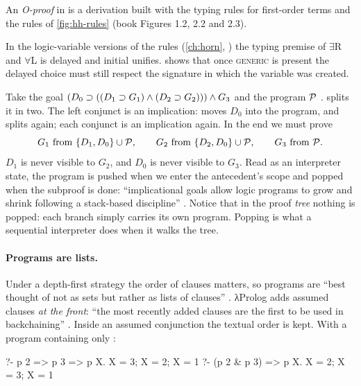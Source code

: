 {\begin{definition}\label{def:hh-oproof}
An \emph{O-proof} in \fohh{} is a derivation built with the typing rules for first-order terms and the
rules of \cref{fig:hh-rules} (book Figures 1.2, 2.2 and 2.3).
\end{definition}

In the logic-variable versions of the rules (\cref{ch:horn}, ) the typing premise of
$\exists$R and $\forall$L is delayed and initial unifies.  shows that once
\textsc{generic} is present the delayed choice must still respect the signature in which the variable was
created.

\begin{tutorial}
Take the goal $(D_0\supset((D_1\supset G_1)\wedge(D_2\supset G_2)))\wedge G_3$ and the program $\mathcal{P}$ .
 splits it in two. The left conjunct is an implication:  moves $D_0$ into
the program, and  splits again; each conjunct is an implication again. In the end we must
prove
\[
G_1 \text{ from } \{D_1,D_0\}\cup\mathcal{P},\qquad
G_2 \text{ from } \{D_2,D_0\}\cup\mathcal{P},\qquad
G_3 \text{ from } \mathcal{P}.
\]
$D_1$ is never visible to $G_2$, and $D_0$ is never visible to $G_3$. Read as an interpreter state,
the program is pushed when we enter the antecedent's scope and popped when the subproof is done:
``implicational goals allow logic programs to grow and shrink following a stack-based discipline''
. Notice that in the proof \emph{tree} nothing is popped: each branch simply carries its own
program. Popping is what a sequential interpreter does when it walks the tree.
\end{tutorial}

\paragraph{Programs are lists.} Under a depth-first strategy the order of clauses matters, so programs
are ``best thought of not as sets but rather as lists of clauses'' . λProlog adds assumed
clauses \emph{at the front}: ``the most recently added clauses are the first to be used in backchaining''
. Inside an assumed conjunction  the textual order is kept. With a program
containing only :
\begin{lprolog}
?- p 2 => p 3 => p X.
X = 3;
X = 2;
X = 1
?- (p 2 & p 3) => p X.
X = 2;
X = 3;
X = 1
\end{lprolog}

}
